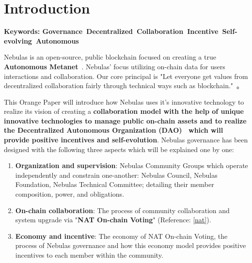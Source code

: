 
\section{Introduction}

\textbf{Keywords: Governance\ Decentralized\ Collaboration\ Incentive\ Self-evolving\ Autonomous }

\vspace{2em}

Nebulas is an open-source, public blockchain focused on creating a true \textbf{Autonomous Metanet}~\cite{AutonomousMetanet}. Nebulas' focus utilizing on-chain data for users interactions and collaboration. Our core principal is "Let everyone get values from decentralized collaboration fairly through technical ways such as blockchain."~\cite{vision}。

This Orange Paper will introduce how Nebulas uses it's innovative technology to realize its vision of creating a \textbf{collaboration model with the help of unique innovative technologies to manage public on-chain assets and to realize the Decentralized Autonomous Organization (DAO)~\cite{DAO} which will provide positive incentives and self-evolution}. Nebulas governance has been designed with the following three aspects which will be explained one by one:

\begin{enumerate}
	\item \textbf{Organization and supervision}:
	Nebulas Community Groups which operate independently and constrain one-another: Nebulas Council, Nebulas Foundation, Nebulas Technical Committee; detailing their member composition, power, and obligations.
	\item \textbf{On-chain collaboration}:
	The process of community collaboration and system upgrade via "\textbf{NAT On-chain Voting}" (Reference: \ref{nat}).
	\item \textbf{Economy and incentive}: 
	The economy of NAT On-chain Voting, the process of Nebulas governance and how this economy model provides positive incentives to each member within the community.
\end{enumerate}
